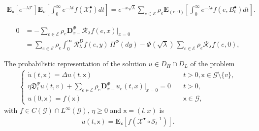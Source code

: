 \documentclass[10pt,a4paper]{amsart}
\begin{document}
		\begin{align}
			\label{resolvent2}
			\mathbf{E}_\mathsf{x}\left[e^{-\lambda \mathcal{T}}\right] \mathbf{E}_v\left[\int_{0}^{\infty} e^{-\lambda t} f(\mathcal{X}^\bullet_t) dt\right] =  e^{-x \sqrt{\lambda}}  \sum_{e \in \mathcal{E}} \rho_e \mathbf{E}_{(e,0)}  \left[\int_0^\infty e^{-\lambda t} f(e, B^\bullet_t) dt\right].
		\end{align}

		\begin{align}
			\label{marchaud-graphs}
			0&=- \sum_{e \in \mathcal{E}} \rho_e \mathbf{D}_{x-}^\Phi \mathcal{R}_\lambda f(e,x)\big\vert_{x=0}\\
			& =\sum_{e \in \mathcal{E}} \rho_e \int_0^\infty \mathcal{R}_\lambda^D f(e,y)\, \Pi^\Phi(dy) - \Phi(\sqrt{\lambda})\, \sum_{e \in \mathcal{E}} \rho_e {\mathcal{R}}_\lambda f(e,0),
		\end{align}

		\begin{theorem}
			\label{thm:Xpallinodelay}
			The probabilistic representation of the solution $u \in D_H \cap D_L$ of the problem
			\begin{align*}
				\begin{cases}
					\dot{u}(t,\mathsf{x})= \Delta u(t,\mathsf{x}) \quad &t>0, \mathsf{x} \in \mathcal{G}\setminus \{v\}, \\
					\eta \mathfrak{D}_t^\Psi u(t,v)+ \sum_{e \in \mathcal{E}} \rho_e\mathbf{D}^\Phi_{x-} u_e(t,x)\big\vert_{x=0}=0 \quad    &t>0,\\
					u(0,\mathsf{x})=f(\mathsf{x}) \quad &\mathsf{x} \in \mathcal{G},
				\end{cases}
			\end{align*}
			with $f \in C(\mathcal{G}) \cap L^\infty(\mathcal{G})$, $\eta \geq 0$  and $\mathsf{x}=(l,x)$ is
			\begin{align*}
				u(t,\mathsf{x})=\mathbf{E}_\mathsf{x}[f(\mathcal{X}^\bullet \circ \mathcal{S}^{-1}_t)].
			\end{align*}
		\end{theorem}
\end{document}
